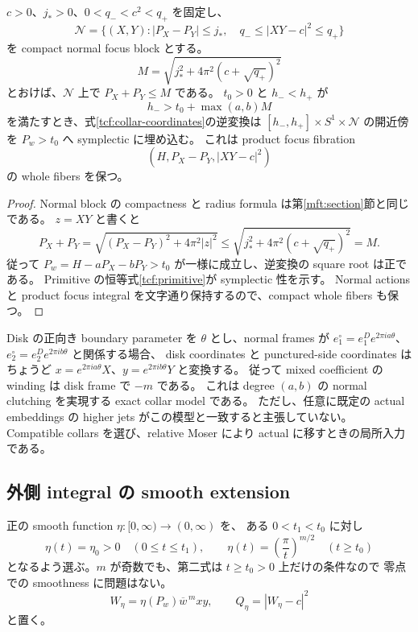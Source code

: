 \begin{proposition}
\label{tcf:exact-collar}
$c>0$、$j_*>0$、$0<q_-<c^2<q_+$ を固定し、
\[
 \mathcal N=\{(X,Y): |P_X-P_Y|\le j_*,\quad
                   q_-\le |XY-c|^2\le q_+\}
\]
を compact normal focus block とする。
\begin{equation}\label{tcf:normal-bound}
 M=\sqrt{j_*^2+4\pi^2(c+\sqrt{q_+})^2}
\end{equation}
とおけば、$\mathcal N$ 上で $P_X+P_Y\le M$ である。
$t_0>0$ と $h_-<h_+$ が
\begin{equation}\label{tcf:collar-bound}
 h_->t_0+\max(a,b)M
\end{equation}
を満たすとき、式\eqref{tcf:collar-coordinates}の逆変換は
$[h_-,h_+]\times S^1\times\mathcal N$ の開近傍を $P_w>t_0$ へ symplectic に埋め込む。
これは product focus fibration
\[
 (H,P_X-P_Y,|XY-c|^2)
\]
の whole fibers を保つ。
\end{proposition}

\begin{proof}
Normal block の compactness と radius formula は第\ref{mft:section}節と同じである。
$z=XY$ と書くと
\[
 P_X+P_Y=\sqrt{(P_X-P_Y)^2+4\pi^2|z|^2}
       \le\sqrt{j_*^2+4\pi^2(c+\sqrt{q_+})^2}=M.
\]
従って $P_w=H-aP_X-bP_Y>t_0$ が一様に成立し、逆変換の square root は正である。
Primitive の恒等式\eqref{tcf:primitive}が symplectic 性を示す。
Normal actions と product focus integral を文字通り保持するので、compact whole fibers も保つ。
\end{proof}

Disk の正向き boundary parameter を $\theta$ とし、normal frames が
$e_1^{\circ}=e_1^D e^{2\pi ia\theta}$、
$e_2^{\circ}=e_2^D e^{2\pi ib\theta}$ と関係する場合、
disk coordinates と punctured-side coordinates はちょうど
$x=e^{2\pi ia\theta}X$、$y=e^{2\pi ib\theta}Y$ と変換する。
従って mixed coefficient の winding は disk frame で $-m$ である。
これは degree $(a,b)$ の normal clutching を実現する exact collar model である。
ただし、任意に既定の actual embeddings の higher jets がこの模型と一致すると主張していない。
Compatible collars を選び、relative Moser により actual に移すときの局所入力である。

\subsection{外側 integral の smooth extension}

正の smooth function $\eta:[0,\infty)\to(0,\infty)$ を、
ある $0<t_1<t_0$ に対し
\[
 \eta(t)=\eta_0>0\quad(0\le t\le t_1),\qquad
 \eta(t)=\left(\frac{\pi}{t}\right)^{m/2}\quad(t\ge t_0)
\]
となるよう選ぶ。$m$ が奇数でも、第二式は $t\ge t_0>0$ 上だけの条件なので
零点での smoothness に問題はない。
\begin{equation}\label{tcf:normalized-W}
 W_\eta=\eta(P_w)\overline w^{\,m}xy,
 \qquad Q_\eta=|W_\eta-c|^2
\end{equation}
と置く。

